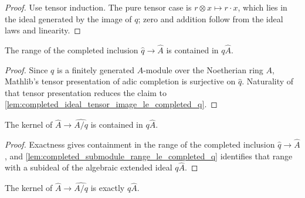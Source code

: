 \begin{proof}
  Use tensor induction.  The pure tensor case is
  \(r\otimes x\mapsto r\cdot x\), which lies in the ideal generated by the
  image of \(q\); zero and addition follow from the ideal laws and linearity.
\end{proof}

\begin{lemma}
  \label{lem:completed_submodule_range_le_completed_q}
  The range of the completed inclusion
  \(\widehat q\to\widehat A\) is contained in \(q\widehat A\).
\end{lemma}

\begin{proof}
  Since \(q\) is a finitely generated \(A\)-module over the Noetherian ring
  \(A\), Mathlib's tensor presentation of adic completion is surjective on
  \(\widehat q\).  Naturality of that tensor presentation reduces the claim to
  \cref{lem:completed_ideal_tensor_image_le_completed_q}.
\end{proof}

\begin{lemma}
  \label{lem:completed_ring_to_quotient_completion_ker_le_completed_q_source}
  The kernel of \(\widehat A\to\widehat{A/q}\) is contained in
  \(q\widehat A\).
\end{lemma}

\begin{proof}
  Exactness gives containment in the range of the completed inclusion
  \(\widehat q\to\widehat A\), and
  \cref{lem:completed_submodule_range_le_completed_q} identifies that range
  with a subideal of the algebraic extended ideal \(q\widehat A\).
\end{proof}

\begin{lemma}
  \label{lem:completed_ring_to_quotient_completion_ker_eq_completed_q_source}
  The kernel of \(\widehat A\to\widehat{A/q}\) is exactly
  \(q\widehat A\).
\end{lemma}

